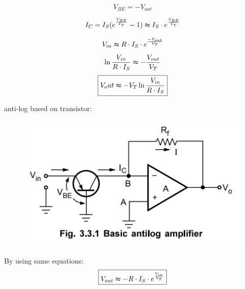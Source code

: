 \documentclass{article}
\begin{document}
\[
V_{BE}=- V_{out}
\]

\[
I_C=I_S(e^{\frac{V_{BE}}{V_T}}-1) \thickapprox I_S \cdot e^{\frac{V_{BE}}{V_T}} 
\]

\[
V_{in} \thickapprox R\cdot I_S \cdot e^{\frac{ - V_{out}}{V_T}}  
\]
\[
\ln{\frac{V_{in}}{R \cdot I_S }} \thickapprox - \frac{V_{out}}{V_T}
\]
\[
\boxed{V_out \thickapprox - V_T \ln{\frac{V_{in}}{R \cdot I_S}}}
\]

anti-log based on transistor:
\begin{figure}[h]
    \centering
    \includegraphics[width=.4\textwidth]{antiLogAmp2.png}
\end{figure}
By using same equations:
\[
\boxed{V_{out} \thickapprox -R \cdot I_S \cdot e^{\frac{V_{in}}{V_T}}}
\]
\end{document}
